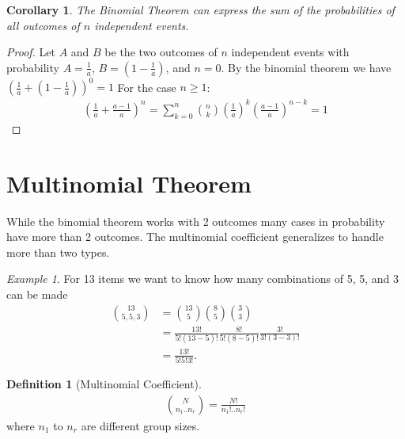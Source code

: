 \documentclass{article}
\theoremstyle{plain}
\newtheorem{corollary}{Corollary}
\theoremstyle{definition}
\newtheorem{definition}{Definition}
\theoremstyle{remark}
\newtheorem{example}{Example}
\begin{document}
\begin{corollary}
  The Binomial Theorem can express the sum of the probabilities of all outcomes of $n$ independent events.
\end{corollary}
\begin{proof}
  Let $A$ and $B$ be the two outcomes of $n$ independent events with probability $A = \frac{1}{a}$, $B = (1 - \frac{1}{a})$, and $n = 0$. By the binomial theorem we have $(\frac{1}{a} + (1 - \frac{1}{a}))^0 = 1$ For the case $n \ge 1$:
  \begin{align*}
    (\frac{1}{a} + \frac{a-1}{a})^n = \sum_{k=0}^{n} \binom{n}{k} (\frac{1}{a})^k(\frac{a-1}{a})^{n-k} = 1
  \end{align*}
\end{proof}

\section{Multinomial Theorem}
While the binomial theorem works with 2 outcomes many cases in probability have more than 2 outcomes. The multinomial coefficient generalizes to handle more than two types. 
\begin{example}
  For 13 items we want to know how many combinations of 5, 5, and 3 can be made
  \begin{align*}
    \binom{13}{5,5,3} &= \binom{13}{5}\binom{8}{5}\binom{3}{3} \\
                      &= \frac{13!}{5!(13-5)!}\frac{8!}{5!(8-5)!}\frac{3!}{3!(3-3)!} \\
                      &=\frac{13!}{5!5!3!}.
  \end{align*}
\end{example}
\begin{definition}[Multinomial Coefficient]
  \begin{align*}
    \binom{N}{n_1..n_r} = \frac{N!}{n_1!..n_r!}
  \end{align*}
  where $n_1$ to $n_r$ are different group sizes.
\end{definition}
\end{document}
